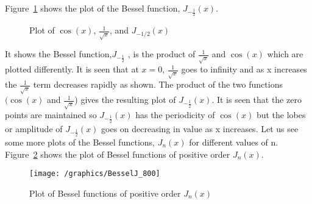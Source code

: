 Figure~\ref{fig:fig-1} shows the plot of the Bessel function, $ J_{-\frac{1}{2}}(x)$.
\begin{figure}[h]
\centering
{}
\caption{Plot of $\cos(x)$, $\frac{1}{\sqrt{x}}$, and $J_{-1/2}(x)$}
\label{fig:fig-1}
\end{figure}

It shows the Bessel function,$J_{-\frac{1}{2}}$ , is the product of $\frac{1}{\sqrt{x}}$ and $\cos(x)$ which are plotted differently. It is seen that at $x=0$, $\frac{1}{\sqrt{x}}$ goes to infinity and as x increases the $\frac{1}{\sqrt{x}}$ term decreases rapidly as shown. The product of the two functions $(\cos(x)$ and $\frac{1}{\sqrt{x}}$) gives the resulting plot of $J_{-\frac{1}{2}}(x)$. It is seen that the zero points are maintained so $J_{-\frac{1}{2}}(x)$ has the periodicity of $\cos(x)$ but the lobes or amplitude of $J_{-\frac{1}{2}}(x)$ goes on decreasing in value as x increases. Let us see some more plots of the Bessel functions, $J_n(x)$ for different values of n. Figure~\ref{fig:bessel-functions} shows the plot of Bessel functions of positive order $J_{n}(x)$.
\begin{figure}[h]
\centering
\texttt{[image: /graphics/BesselJ\_800]}
\caption{Plot of Bessel functions of positive order $J_{n}(x)$}
\label{fig:bessel-functions}
\end{figure}

